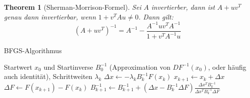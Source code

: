 \documentclass[10pt,a4paper]{article}
\newtheorem{theorem}{Theorem}
\begin{document}
	\begin{theorem}[Sherman-Morrison-Formel]
		Sei $A$ invertierber, dann ist $A+uv^T$ genau dann invertierbar, wenn $1 + v^TAu \neq 0$. Dann gilt:
		$$(A+uv^T)^{-1} = A^{-1} - \frac{A^{-1}uv^TA^{-1}}{1+v^TA^{-1}u}$$
	\end{theorem}
	\begin{algorithm}
		\caption{BFGS-Algorithmus}
		\begin{algorithmic}
			\Require Startwert $x_0$ und Startinverse $B_0^{-1}$ (Approximation von $DF^{-1}(x_0)$, oder häufig auch identität), Schrittweiten $\lambda_k$
			\State $\Delta x \leftarrow -\lambda_kB_k^{-1}F(x_k)$
			\State $x_{k+1}\leftarrow x_k + \Delta x$
			\State $\Delta F \leftarrow F(x_{k+1}) -F(x_k)$
			\State $B_{k+1}^{-1} \leftarrow B_{k+1}^{-1} + (\Delta x -B^{-1}_k\Delta F)\frac{\Delta x^T B^{-1}_{k}}{\Delta x^T B^{-1}_{k}\Delta F}$
			\EndFor 
		\end{algorithmic}
	\end{algorithm}
\end{document}
